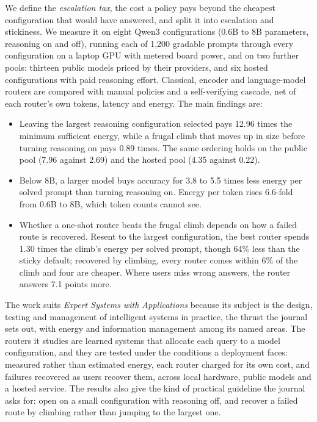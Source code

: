 \documentclass[11pt]{article}
\begin{document}
We define the \emph{escalation tax}, the cost a policy pays beyond the cheapest
configuration that would have answered, and split it into escalation and
stickiness. We measure it on eight Qwen3 configurations (0.6B to 8B parameters,
reasoning on and off), running each of 1{,}200 gradable prompts through every
configuration on a laptop GPU with metered board power, and on two further
pools: thirteen public models priced by their providers, and six hosted
configurations with paid reasoning effort. Classical, encoder and
language-model routers are compared with manual policies and a self-verifying
cascade, net of each router's own tokens, latency and energy. The main findings
are:
\begin{itemize}\setlength{\itemsep}{0.15em}
  \item Leaving the largest reasoning configuration selected pays 12.96 times
        the minimum sufficient energy, while a frugal climb that moves up in
        size before turning reasoning on pays 0.89 times. The same ordering
        holds on the public pool (7.96 against 2.69) and the hosted pool (4.35
        against 0.22).
  \item Below 8B, a larger model buys accuracy for 3.8 to 5.5 times less energy
        per solved prompt than turning reasoning on. Energy per token rises
        6.6-fold from 0.6B to 8B, which token counts cannot see.
  \item Whether a one-shot router beats the frugal climb depends on how a failed
        route is recovered. Resent to the largest configuration, the best router
        spends 1.30 times the climb's energy per solved prompt, though 64\% less
        than the sticky default; recovered by climbing, every router comes
        within 6\% of the climb and four are cheaper. Where users miss wrong
        answers, the router answers 7.1 points more.
\end{itemize}

The work suits \emph{Expert Systems with Applications} because its subject is
the design, testing and management of intelligent systems in practice, the
thrust the journal sets out, with energy and information management among its
named areas. The routers it studies are learned systems that allocate each
query to a model configuration, and they are tested under the conditions a
deployment faces: measured rather than estimated energy, each router charged
for its own cost, and failures recovered as users recover them, across local
hardware, public models and a hosted service. The results also give the kind
of practical guideline the journal asks for: open on a small configuration
with reasoning off, and recover a failed route by climbing rather than jumping
to the largest one.
\end{document}
